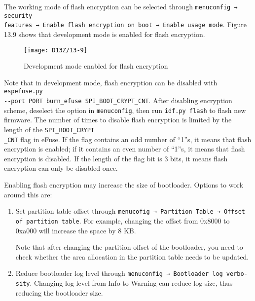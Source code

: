 \documentclass[a4paper,12pt]{book}
\begin{document}
The working mode of flash encryption can be selected through \verb|menuconfig → security|\\ \verb|features → Enable flash encryption on boot → Enable usage mode|. Figure 13.9 shows that development mode is enabled for flash encryption.

\begin{figure}[!h]
    \centering
    \texttt{[image: D13Z/13-9]}
    \caption{Development mode enabled for flash encryption}
\end{figure}

Note that in development mode, flash encryption can be disabled with \verb|espefuse.py|\\ \verb|--port PORT burn_efuse SPI_BOOT_CRYPT_CNT|. After disabling encryption scheme, deselect the option in \verb|menuconfig|, then run \verb|idf.py flash| to flash new firmware. The number of times to disable flash encryption is limited by the length of the \verb|SPI_BOOT_CRYPT|\\ \verb|_CNT| flag in eFuse. If the flag contains an odd number of “1”s, it means that flash encryption is enabled; if it contains an even number of “1”s, it means that flash encryption is disabled. If the length of the flag bit is 3 bits, it means flash encryption can only be disabled once.


Enabling flash encryption may increase the size of bootloader. Options to work around this are: 

\begin{enumerate}[label=(\arabic*)]
    \item Set partition table offset through \verb|menucofig → Partition Table → Offset|\\ \verb|of partition table|. For example, changing the offset from 0x8000 to 0xa000 will increase the space by 8 KB.
    
    Note that after changing the partition offset of the bootloader, you need to check whether the area allocation in the partition table needs to be updated.

    \item Reduce bootloader log level through \verb|menuconfig → Bootloader log verbo-|\\ \verb|sity|. Changing log level from Info to Warning can reduce log size, thus reducing the bootloader size.
\end{enumerate}
\end{document}
